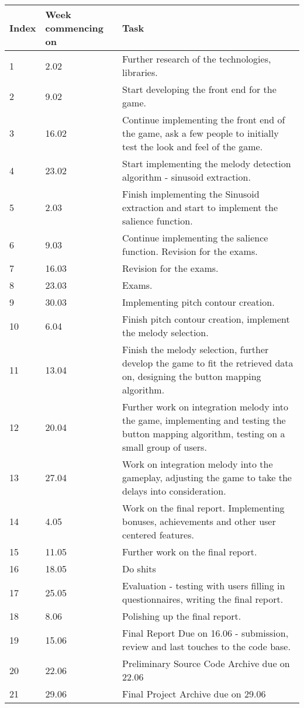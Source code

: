 \begin{center}
\begin{tabular}{| l | l | p{9cm} |}
\hline
    Index & Week commencing on  & Task  \\ \hline
    1 & 2.02 & Further research of the technologies, libraries.\\ \hline
    2 & 9.02 & Start developing the front end for the game. \\ \hline
    3 & 16.02 & Continue implementing the front end of the game, ask a few people to initially test the look and feel of the game. \\ \hline
    4 & 23.02 & Start implementing the melody detection algorithm -  sinusoid extraction.\\ \hline
    5 & 2.03 & Finish implementing the Sinusoid extraction and start to implement the salience function.\\ \hline
    6 & 9.03 & Continue implementing the salience function. Revision for the exams.\\ \hline
    7 & 16.03 & Revision for the exams. \\ \hline
    8 & 23.03 & Exams. \\ \hline
    9 & 30.03 & Implementing pitch contour creation. \\ \hline
    10 & 6.04 & Finish pitch contour creation, implement the melody selection. \\ \hline
    11 & 13.04 & Finish the melody selection, further develop the game to fit the retrieved data on, designing the button mapping algorithm. \\ \hline
    12 & 20.04 & Further work on integration melody into the game, implementing and testing the button mapping algorithm, testing on a small group of users. \\ \hline
    13 & 27.04 & Work on integration melody into the gameplay, adjusting the game to take the delays into consideration. \\ \hline
    14 & 4.05 & Work on the final report. Implementing bonuses, achievements and other user centered features. \\ \hline
    15 & 11.05 & Further work on the final report. \\ \hline
    16 & 18.05 & Do shits \\ \hline
    17 & 25.05 & Evaluation - testing with users filling in questionnaires, writing the final report. \\ \hline
    18 & 8.06 & Polishing up the final report. \\ \hline
    19 & 15.06 & Final Report Due on 16.06 - submission, review and last touches to the code base.\\ \hline
    20 & 22.06 & Preliminary Source Code Archive due on 22.06\\ \hline
    21 & 29.06 & Final Project Archive due on 29.06\\ \hline
    
    \end{tabular}
\end{center}
